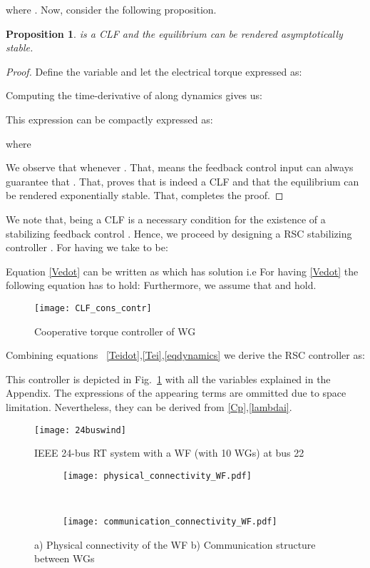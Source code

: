 \documentclass[letterpaper, 10 pt, conference]{ieeeconf}
\newtheorem{proposition}{\textnormal{\textbf{Proposition}}}
\begin{document}
where .
Now, consider the following proposition.
\begin{proposition}
 is a \textit{CLF} and the equilibrium  can be rendered \textit{asymptotically stable}.
\end{proposition}
\begin{proof}
Define the variable  and let the electrical torque expressed as:

 Computing the time-derivative of  along  dynamics gives us:

This expression can be compactly expressed as:

where 

We observe that  whenever . That, means the feedback control input  can always guarantee that   . That, proves that  is indeed a CLF and that the equilibrium  can be rendered exponentially stable. That, completes the proof.\end{proof}
We note that,    being a   CLF is a necessary condition for the existence of a stabilizing feedback control . Hence, we proceed by designing a RSC stabilizing controller . For having  we take  to be:

Equation \eqref{Vedot} can be written as  which has solution  i.e  
For having \eqref{Vedot} the following equation has to hold: 
Furthermore, we assume that   and  hold.
\begin{figure}
\centering
\texttt{[image: CLF\_cons\_contr]}
\caption{Cooperative torque controller of WG }
\label{CLFcontr}
\end{figure} 
 Combining equations~ \eqref{Teidot},\eqref{Tei},\eqref{eqdynamics} we derive the RSC controller as:

This controller is depicted in Fig.~\ref{CLFcontr} with all the variables explained in the Appendix.
The expressions of the appearing terms  are ommitted due to space limitation. Nevertheless, they can be derived from \eqref{Cp},\eqref{lambdai}.




\begin{figure}
\begin{center}
\texttt{[image: 24buswind]}
\caption{IEEE 24-bus RT system with a WF (with 10 WGs) at bus 22}
\label{24buswind}
\end{center}
\end{figure}


\begin{figure}
       \begin{subfigure}{0.34\textwidth}
   \texttt{[image: physical\_connectivity\_WF.pdf]}
        \caption{}
        \label{physicalcon}
    \end{subfigure}\\
    \begin{subfigure}{0.32\textwidth}    
   \texttt{[image: communication\_connectivity\_WF.pdf]}
        \caption{} 
        \label{commcon}
    \end{subfigure}
         \caption{a) Physical connectivity of the WF b) Communication structure between WGs }
        \label{physcomtop}
\end{figure}
\end{document}
